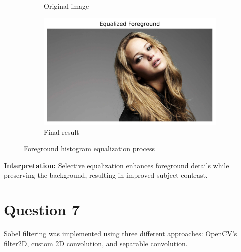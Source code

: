 \documentclass[10pt,a4paper]{article}
\begin{document}
\begin{figure}[H]
\begin{subfigure}{0.24\textwidth}
        \caption{Original image}
    \end{subfigure}
    \begin{subfigure}{0.24\textwidth}
        \includegraphics[width=\textwidth]{task6/5_result.png}
        \caption{Final result}
    \end{subfigure}
    \caption{Foreground histogram equalization process}
\end{figure}

\textbf{Interpretation:} Selective equalization enhances foreground details while preserving the background, resulting in improved subject contrast.

\section{Question 7}
Sobel filtering was implemented using three different approaches: OpenCV's filter2D, custom 2D convolution, and separable convolution.
\end{document}
